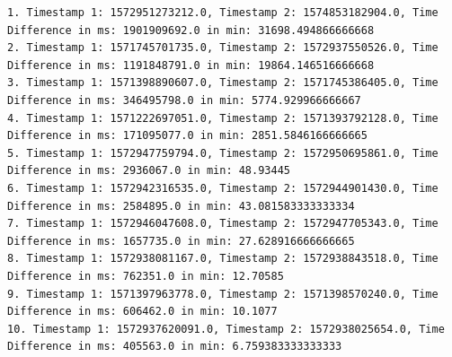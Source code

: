 \begin{lstlisting}
1. Timestamp 1: 1572951273212.0, Timestamp 2: 1574853182904.0, Time Difference in ms: 1901909692.0 in min: 31698.494866666668 
2. Timestamp 1: 1571745701735.0, Timestamp 2: 1572937550526.0, Time Difference in ms: 1191848791.0 in min: 19864.146516666668 
3. Timestamp 1: 1571398890607.0, Timestamp 2: 1571745386405.0, Time Difference in ms: 346495798.0 in min: 5774.929966666667 
4. Timestamp 1: 1571222697051.0, Timestamp 2: 1571393792128.0, Time Difference in ms: 171095077.0 in min: 2851.5846166666665 
5. Timestamp 1: 1572947759794.0, Timestamp 2: 1572950695861.0, Time Difference in ms: 2936067.0 in min: 48.93445 
6. Timestamp 1: 1572942316535.0, Timestamp 2: 1572944901430.0, Time Difference in ms: 2584895.0 in min: 43.081583333333334 
7. Timestamp 1: 1572946047608.0, Timestamp 2: 1572947705343.0, Time Difference in ms: 1657735.0 in min: 27.628916666666665 
8. Timestamp 1: 1572938081167.0, Timestamp 2: 1572938843518.0, Time Difference in ms: 762351.0 in min: 12.70585 
9. Timestamp 1: 1571397963778.0, Timestamp 2: 1571398570240.0, Time Difference in ms: 606462.0 in min: 10.1077 
10. Timestamp 1: 1572937620091.0, Timestamp 2: 1572938025654.0, Time Difference in ms: 405563.0 in min: 6.759383333333333 
\end{lstlisting}

